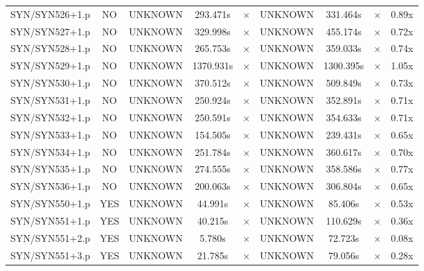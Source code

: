 \documentclass[a4paper,10pt]{article}
\begin{document}
\begin{longtable}{lcccccccc}
SYN/SYN526+1.p & NO & UNKNOWN & 293.471s & \cellcolor{mismatchcolor}$\times$ & UNKNOWN & 331.464s & \cellcolor{mismatchcolor}$\times$ & 0.89x \\
SYN/SYN527+1.p & NO & UNKNOWN & 329.998s & \cellcolor{mismatchcolor}$\times$ & UNKNOWN & 455.174s & \cellcolor{mismatchcolor}$\times$ & 0.72x \\
SYN/SYN528+1.p & NO & UNKNOWN & 265.753s & \cellcolor{mismatchcolor}$\times$ & UNKNOWN & 359.033s & \cellcolor{mismatchcolor}$\times$ & 0.74x \\
SYN/SYN529+1.p & NO & UNKNOWN & 1370.931s & \cellcolor{mismatchcolor}$\times$ & UNKNOWN & 1300.395s & \cellcolor{mismatchcolor}$\times$ & 1.05x \\
SYN/SYN530+1.p & NO & UNKNOWN & 370.512s & \cellcolor{mismatchcolor}$\times$ & UNKNOWN & 509.849s & \cellcolor{mismatchcolor}$\times$ & 0.73x \\
SYN/SYN531+1.p & NO & UNKNOWN & 250.924s & \cellcolor{mismatchcolor}$\times$ & UNKNOWN & 352.891s & \cellcolor{mismatchcolor}$\times$ & 0.71x \\
SYN/SYN532+1.p & NO & UNKNOWN & 250.591s & \cellcolor{mismatchcolor}$\times$ & UNKNOWN & 354.633s & \cellcolor{mismatchcolor}$\times$ & 0.71x \\
SYN/SYN533+1.p & NO & UNKNOWN & 154.505s & \cellcolor{mismatchcolor}$\times$ & UNKNOWN & 239.431s & \cellcolor{mismatchcolor}$\times$ & 0.65x \\
SYN/SYN534+1.p & NO & UNKNOWN & 251.784s & \cellcolor{mismatchcolor}$\times$ & UNKNOWN & 360.617s & \cellcolor{mismatchcolor}$\times$ & 0.70x \\
SYN/SYN535+1.p & NO & UNKNOWN & 274.555s & \cellcolor{mismatchcolor}$\times$ & UNKNOWN & 358.586s & \cellcolor{mismatchcolor}$\times$ & 0.77x \\
SYN/SYN536+1.p & NO & UNKNOWN & 200.063s & \cellcolor{mismatchcolor}$\times$ & UNKNOWN & 306.804s & \cellcolor{mismatchcolor}$\times$ & 0.65x \\
SYN/SYN550+1.p & YES & UNKNOWN & 44.991s & \cellcolor{mismatchcolor}$\times$ & UNKNOWN & 85.406s & \cellcolor{mismatchcolor}$\times$ & 0.53x \\
SYN/SYN551+1.p & YES & UNKNOWN & 40.215s & \cellcolor{mismatchcolor}$\times$ & UNKNOWN & 110.629s & \cellcolor{mismatchcolor}$\times$ & 0.36x \\
SYN/SYN551+2.p & YES & UNKNOWN & 5.780s & \cellcolor{mismatchcolor}$\times$ & UNKNOWN & 72.723s & \cellcolor{mismatchcolor}$\times$ & 0.08x \\
SYN/SYN551+3.p & YES & UNKNOWN & 21.785s & \cellcolor{mismatchcolor}$\times$ & UNKNOWN & 79.056s & \cellcolor{mismatchcolor}$\times$ & 0.28x \\

\end{longtable}
\end{document}
